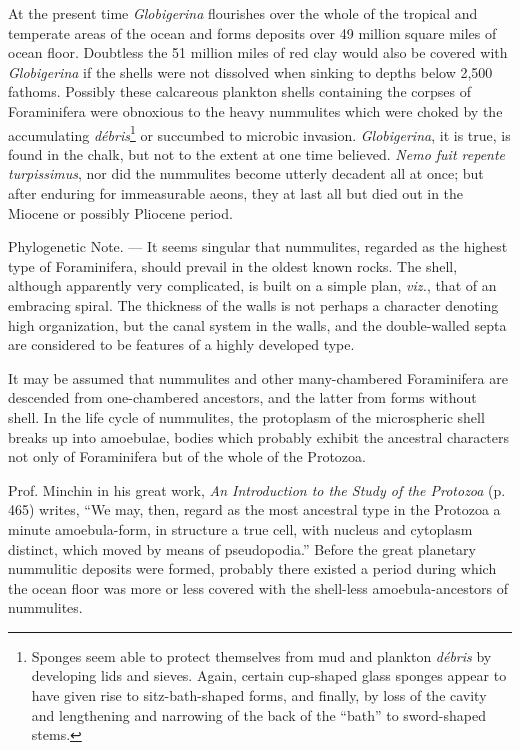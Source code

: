 \documentclass[a4paper, 12pt, oneside, landscape]{article}
\begin{document}
At the present time \emph{Globigerina} flourishes over the whole of the tropical and temperate areas of the ocean and forms deposits over 49 million square miles of ocean floor. Doubtless the 51 million miles of red clay would also be covered with \emph{Globigerina} if the shells were not dissolved when sinking to depths below 2,500 fathoms. Possibly these calcareous plankton shells containing the corpses of Foraminifera were obnoxious to the heavy nummulites which were choked by the accumulating \emph{débris}\footnote{Sponges seem able to protect themselves from mud and plankton \emph{débris} by developing lids and sieves. Again, certain cup-shaped glass sponges appear to have given rise to sitz-bath-shaped forms, and finally, by loss of the cavity and lengthening and narrowing of the back of the ``bath'' to sword-shaped stems.} or succumbed to microbic invasion. \emph{Globigerina}, it is true, is found in the chalk, but not to the extent at one time believed. \emph{Nemo fuit repente turpissimus}, nor did the nummulites become utterly decadent all at once; but after enduring for immeasurable aeons, they at last all but died out in the Miocene or possibly Pliocene period.

Phylogenetic Note. --- It seems singular that nummulites, regarded as the highest type of Foraminifera, should prevail in the oldest known rocks. The shell, although apparently very complicated, is built on a simple plan, \emph{viz.}, that of an embracing spiral. The thickness of the walls is not perhaps a character denoting high organization, but the canal system in the walls, and the double-walled septa are considered to be features of a highly developed type.

It may be assumed that nummulites and other many-chambered Foraminifera are descended from one-chambered ancestors, and the latter from forms without shell. In the life cycle of nummulites, the protoplasm of the microspheric shell breaks up into amoebulae, bodies which probably exhibit the ancestral characters not only of Foraminifera but of the whole of the Protozoa.

Prof. Minchin in his great work, \emph{An Introduction to the Study of the Protozoa} (p. 465) writes, ``We may, then, regard as the most ancestral type in the Protozoa a minute amoebula-form, in structure a true cell, with nucleus and cytoplasm distinct, which moved by means of pseudopodia.'' Before the great planetary nummulitic deposits were formed, probably there existed a period during which the ocean floor was more or less covered with the shell-less amoebula-ancestors of nummulites.
\end{document}
